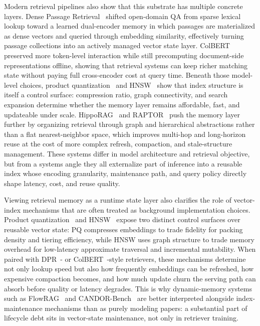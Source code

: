 \documentclass[acmsmall,screen,review]{acmart}
\begin{document}
Modern retrieval pipelines also show that this substrate has multiple concrete layers. Dense Passage Retrieval~\cite{karpukhin2020dpr} shifted open-domain QA from sparse lexical lookup toward a learned dual-encoder memory in which passages are materialized as dense vectors and queried through embedding similarity, effectively turning passage collections into an actively managed vector state layer. ColBERT~\cite{khattab2020colbert} preserved more token-level interaction while still precomputing document-side representations offline, showing that retrieval systems can keep richer matching state without paying full cross-encoder cost at query time. Beneath those model-level choices, product quantization~\cite{jegou2011pq} and HNSW~\cite{malkov2020hnsw} show that index structure is itself a control surface: compression ratio, graph connectivity, and search expansion determine whether the memory layer remains affordable, fast, and updateable under scale. HippoRAG~\cite{wang2024hipporag} and RAPTOR~\cite{sarthi2024raptor} push the memory layer further by organizing retrieval through graph and hierarchical abstractions rather than a flat nearest-neighbor space, which improves multi-hop and long-horizon reuse at the cost of more complex refresh, compaction, and stale-structure management. These systems differ in model architecture and retrieval objective, but from a systems angle they all externalize part of inference into a reusable index whose encoding granularity, maintenance path, and query policy directly shape latency, cost, and reuse quality.

Viewing retrieval memory as a runtime state layer also clarifies the role of vector-index mechanisms that are often treated as background implementation choices. Product quantization~\cite{jegou2011pq} and HNSW~\cite{malkov2020hnsw} expose two distinct control surfaces over reusable vector state: PQ compresses embeddings to trade fidelity for packing density and tiering efficiency, while HNSW uses graph structure to trade memory overhead for low-latency approximate traversal and incremental mutability. When paired with DPR~\cite{karpukhin2020dpr}- or ColBERT~\cite{khattab2020colbert}-style retrievers, these mechanisms determine not only lookup speed but also how frequently embeddings can be refreshed, how expensive compaction becomes, and how much update churn the serving path can absorb before quality or latency degrades. This is why dynamic-memory systems such as FlowRAG~\cite{zhang2026flowrag} and CANDOR-Bench~\cite{wang2026candor} are better interpreted alongside index-maintenance mechanisms than as purely modeling papers: a substantial part of lifecycle debt sits in vector-state maintenance, not only in retriever training.
\end{document}
